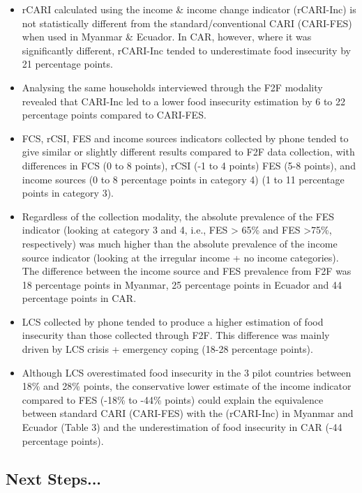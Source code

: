 \documentclass[11pt,harvard]{article}
\begin{document}
	\begin{itemize}[left=1.5em]
		\item rCARI calculated using the income \& income change indicator (rCARI-Inc) is not statistically different from the standard/conventional CARI (CARI-FES) when used in Myanmar \& Ecuador. In CAR, however, where it was significantly different, rCARI-Inc tended to underestimate food insecurity by 21 percentage points. 
		
		\item Analysing the same households interviewed through the F2F modality revealed that CARI-Inc led to a lower food insecurity estimation by 6 to 22 percentage points compared to CARI-FES.
		
		\item FCS, rCSI, FES and income sources indicators collected by phone tended to give similar or slightly different results compared to F2F data collection, with differences in FCS (0 to 8 points), rCSI (-1 to 4 points) FES (5-8 points), and income sources (0 to 8 percentage points in category 4) (1 to 11 percentage points in category 3).
		
		\item Regardless of the collection modality, the absolute prevalence of the FES indicator (looking at category 3 and 4, i.e., FES > 65\% and FES >75\%, respectively) was much higher than the absolute prevalence of the income source indicator (looking at the irregular income + no income categories). The difference between the income source and FES prevalence from F2F was 18 percentage points in Myanmar, 25 percentage points in Ecuador and 44 percentage points in CAR.
		
		\item LCS collected by phone tended to produce a higher estimation of food insecurity than those collected through F2F. This difference was mainly driven by LCS crisis + emergency coping (18-28 percentage points).
		
		\item Although LCS overestimated food insecurity in the 3 pilot countries between 18\% and 28\% points, the conservative lower estimate of the income indicator compared to FES (-18\% to
		-44\% points) could explain the equivalence between standard CARI (CARI-FES) with the (rCARI-Inc) in Myanmar and Ecuador (Table 3) and the underestimation of food insecurity in CAR (-44 percentage points).
	\end{itemize}
	

\subsection{Next Steps...}
\end{document}
